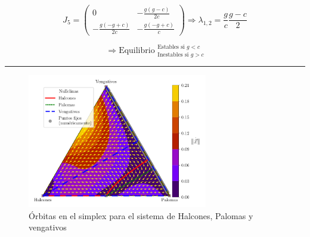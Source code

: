 \documentclass[twocolumn,aps,prl]{revtex4-1}
\newcommand*\sepline{%
  \begin{center}
    \rule[1ex]{.5\textwidth}{.5pt}
  \end{center}}
\begin{document}

$$J_5 =
\begin{pmatrix}
    0
    &
    -\frac{g\left(g-c\right)}{2c}
    \\  
    -\frac{g\left(-g+c\right)}{2c}
    &
    -\frac{g\left(-g+c\right)}{c}
\end{pmatrix}
\Rightarrow  \lambda_{1,2} = \frac{g}{c} \frac{g-c}{2}
$$

$$
\Rightarrow \text{Equilibrio }  ^{\text{Estables si } g<c}_{\text{Inestables si } g>c}
$$



\sepline

\begin{figure}[ht!]
    \centering
        \includegraphics[width = 0.7\textwidth]{figuras/ex01-b.pdf}
    \caption{Órbitas en el simplex para el sistema de Halcones, Palomas y vengativos}
    \label{fig:figuras/ex01-b}
\end{figure}
\end{document}
